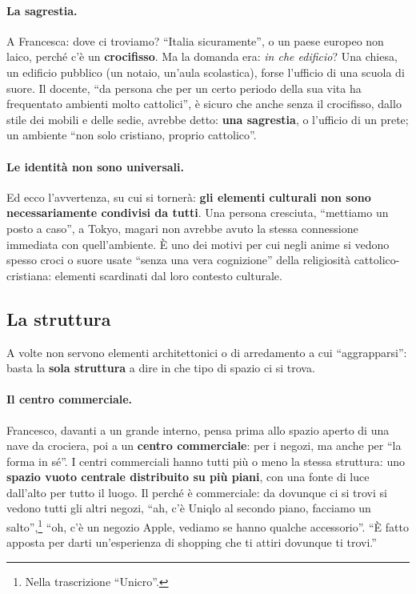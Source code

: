\paragraph{La sagrestia.} A Francesca: dove ci troviamo? ``Italia sicuramente'', o un paese
europeo non laico, perché c'è un \textbf{crocifisso}. Ma la domanda era: \emph{in che
edificio}? Una chiesa, un edificio pubblico (un notaio, un'aula scolastica), forse
l'ufficio di una scuola di suore. Il docente, ``da persona che per un certo periodo della
sua vita ha frequentato ambienti molto cattolici'', è sicuro che anche senza il crocifisso,
dallo stile dei mobili e delle sedie, avrebbe detto: \textbf{una sagrestia}, o l'ufficio
di un prete; un ambiente ``non solo cristiano, proprio cattolico''.

\paragraph{Le identità non sono universali.} Ed ecco l'avvertenza, su cui si tornerà:
\textbf{gli elementi culturali non sono necessariamente condivisi da tutti}. Una persona
cresciuta, ``mettiamo un posto a caso'', a Tokyo, magari non avrebbe avuto la stessa
connessione immediata con quell'ambiente. È uno dei motivi per cui negli anime si vedono
spesso croci o suore usate ``senza una vera cognizione'' della religiosità
cattolico-cristiana: elementi scardinati dal loro contesto culturale.

\subsection{La struttura}

A volte non servono elementi architettonici o di arredamento a cui ``aggrapparsi'': basta
la \textbf{sola struttura} a dire in che tipo di spazio ci si trova.

\paragraph{Il centro commerciale.} Francesco, davanti a un grande interno, pensa prima allo
spazio aperto di una nave da crociera, poi a un \textbf{centro commerciale}: per i negozi,
ma anche per ``la forma in sé''. I centri commerciali hanno tutti più o meno la stessa
struttura: uno \textbf{spazio vuoto centrale distribuito su più piani}, con una fonte di
luce dall'alto per tutto il luogo. Il perché è commerciale: da dovunque ci si trovi si
vedono tutti gli altri negozi, ``ah, c'è Uniqlo al secondo piano, facciamo un
salto'',\footnote{Nella trascrizione ``Unicro''.} ``oh, c'è un negozio Apple, vediamo se
hanno qualche accessorio''. ``È fatto apposta per darti un'esperienza di shopping che ti
attiri dovunque ti trovi.''

